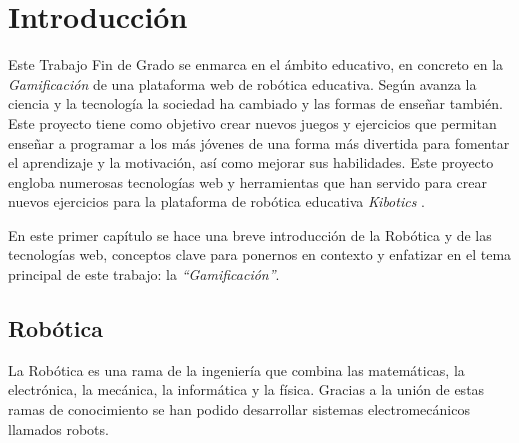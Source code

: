 \chapter{Introducción}
\label{chap:introduccion} 
Este Trabajo Fin de Grado se enmarca en el ámbito educativo, en concreto en la \textit{Gamificación} de una plataforma web de robótica educativa. Según avanza la ciencia y la tecnología la sociedad ha cambiado y las formas de enseñar también. Este proyecto tiene como objetivo crear nuevos juegos y ejercicios que permitan enseñar a programar a los más jóvenes de una forma más divertida para fomentar el aprendizaje y la motivación, así como mejorar sus habilidades. Este proyecto engloba numerosas tecnologías web y herramientas que han servido para crear nuevos ejercicios para la plataforma de robótica educativa \textit{Kibotics} \cite{intro}.

En este primer capítulo se hace una breve introducción de la Robótica y de las tecnologías web, conceptos clave para ponernos en contexto y enfatizar en el tema principal de este trabajo: la \textit{``Gamificación''}.


\section{Robótica}\label{motivacion}
La Robótica es una rama de la ingeniería que combina las matemáticas, la electrónica, la mecánica, la informática y la física. Gracias a la unión de estas ramas de conocimiento se han podido desarrollar sistemas electromecánicos llamados robots. 

